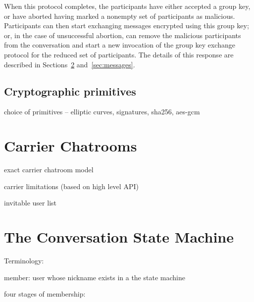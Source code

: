 \documentclass{article}
\begin{document}
When this protocol completes, the participants have either accepted a group key, or have aborted having marked a nonempty set of participants as malicious.
Participants can then start exchanging messages encrypted using this group key; or, in the case of unsuccessful abortion, can remove the malicious participants from the conversation and start a new invocation of the group key exchange protocol for the reduced set of participants.
The details of this response are described in Sections~\ref{sec:conversation-state-machine} and~\ref{sec:messages}.




\subsection{Cryptographic primitives}
\label{sec:cryptography/cryptographic-primitives}


choice of primitives -- elliptic curves, signatures, sha256, aes-gcm


\section{Carrier Chatrooms}
\label{sec:carrier-chatrooms}
exact carrier chatroom model

carrier limitations (based on high level API)

invitable user list


\section{The Conversation State Machine}
\label{sec:conversation-state-machine}








Terminology:

member: user whose nickname exists in a the state machine

four stages of membership:
\end{document}
